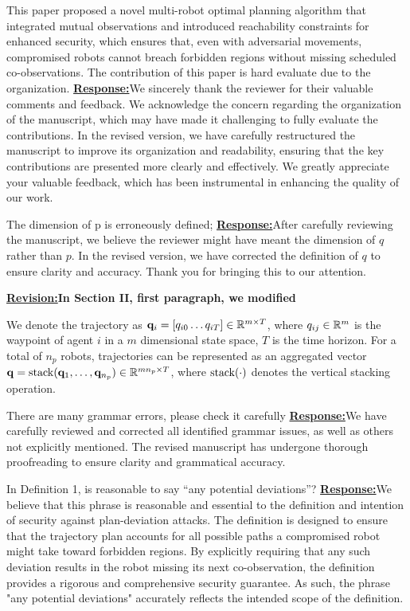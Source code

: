 \documentclass{article}
\newcommand{\re}{\tcblower \underline{\textbf{Response:}}\quad}
\newcommand{\rv}{{\large{\underline{\textbf{Revision:}}}}\quad}
\newcommand{\news}{\color{blue}}
\begin{document}
\begin{cmt*}{}{}
	This paper proposed a novel multi-robot optimal planning algorithm that
	integrated mutual observations and introduced reachability constraints
	for enhanced security, which ensures that, even with adversarial
	movements, compromised robots cannot breach forbidden regions without
	missing scheduled co-observations. The contribution of this paper is
	hard evaluate due to the organization. 
	\re We sincerely thank the reviewer for their valuable comments and feedback. We acknowledge the concern regarding the organization of the manuscript, which may have made it challenging to fully evaluate the contributions. In the revised version, we have carefully restructured the manuscript to improve its organization and readability, ensuring that the key contributions are presented more clearly and effectively. We greatly appreciate your valuable feedback, which has been instrumental in enhancing the quality of our work.
\end{cmt*}
\begin{cmt}{}{}
The dimension of p is erroneously defined;
\re After carefully reviewing the manuscript, we believe the reviewer might have meant the dimension of $q$ rather than $p$. In the revised version, we have corrected the definition of $q$ to ensure clarity and accuracy. Thank you for bringing this to our attention.
\end{cmt}
\rv \textbf{In Section II, first paragraph, we modified}

{\news We denote the trajectory as $\mathbf{q}_i = [q_{i0}\dots q_{iT}]\in\mathbb{R}^{m\times T}{}$, where $q_{ij}\in\mathbb{R}^{m}{}$ is the waypoint of agent $i$ in a $m$ dimensional state space, $T$ is the time horizon. For a total of $n_p$ robots, trajectories can be represented as an aggregated vector $\mathbf{q} = \operatorname{stack}(\mathbf{q}_1,\dots,\mathbf{q}_{n_p})\in \mathbb{R}^{m n_p\times T}{}$, where $\operatorname{stack}(\cdot)$ denotes the vertical stacking operation. }

\begin{cmt}{}{}
There are many grammar errors, please check it carefully
\re We have carefully reviewed and corrected all identified grammar issues, as well as others not explicitly mentioned. The revised manuscript has undergone thorough proofreading to ensure clarity and grammatical accuracy.

\end{cmt}

\begin{cmt}{}{}
In Definition 1, is reasonable to say ``any potential deviations''?
\re We believe that this phrase is reasonable and essential to the definition and intention of security against plan-deviation attacks. The definition is designed to ensure that the trajectory plan accounts for all possible paths a compromised robot might take toward forbidden regions. By explicitly requiring that any such deviation results in the robot missing its next co-observation, the definition provides a rigorous and comprehensive security guarantee. As such, the phrase "any potential deviations" accurately reflects the intended scope of the definition.
\end{cmt}
\end{document}
